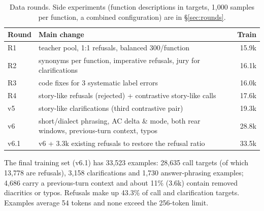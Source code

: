 \begin{table}[t]
\centering\small
\begin{tabular}{@{}lp{4.9cm}r@{}}
\toprule
Round & Main change & Train \\
\midrule
R1 & teacher pool, 1:1 refusals, balanced 300/function & 15.9k \\
R2 & synonyms per function, imperative refusals, jury for clarifications & 16.1k \\
R3 & code fixes for 3 systematic label errors & 16.0k \\
R4 & story-like refusals (rejected) + contrastive story-like calls & 17.6k \\
v5 & story-like clarifications (third contrastive pair) & 19.3k \\
v6 & short/dialect phrasing, AC delta \& mode, both rear windows, previous-turn context, typos & 28.8k \\
v6.1 & v6 + 3.3k existing refusals to restore the refusal ratio & 33.5k \\
\bottomrule
\end{tabular}
\caption{Data rounds. Side experiments (function descriptions in targets, 1,000 samples per function, a combined
configuration) are in \S\ref{sec:rounds}.}
\label{tab:rounds}
\end{table}

The final training set (v6.1) has 33,523 examples: 28,635 call targets (of which 13,778 are refusals), 3,158 clarifications and
1,730 answer-phrasing examples; 4,686 carry a previous-turn context and about 11\% (3.6k) contain removed diacritics or typos.
Refusals make up 43.3\% of call and clarification targets. Examples average 54 tokens and none exceed the 256-token limit.
